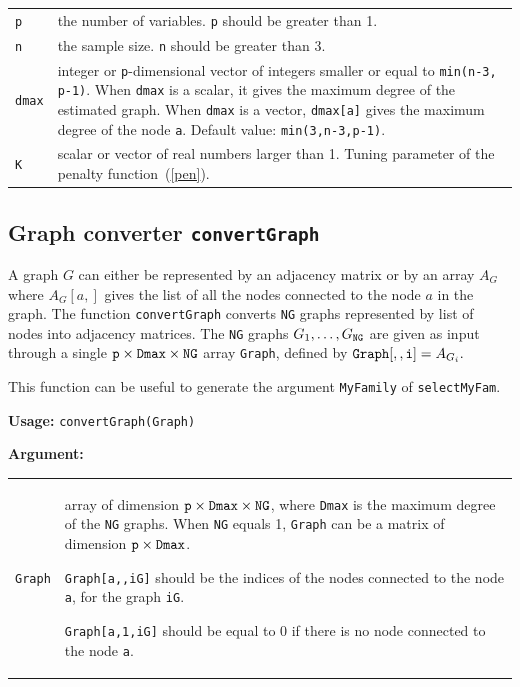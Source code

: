 \documentclass[noinfoline]{imsart}
\begin{document}
\begin{tabular}{lp{13cm}}
{\tt p}&	 the number of variables. {\tt p} should be greater than 1.\\
{\tt n}&	 the sample size. {\tt n} should be greater than 3.\\
{\tt dmax}&	 integer or {\tt p}-dimensional vector of integers smaller or equal to {\tt min(n-3, p-1)}. When {\tt dmax} is a scalar, it gives the maximum degree of the estimated graph. When {\tt dmax} is a vector, {\tt dmax[a]} gives the maximum degree of the node {\tt a}. Default value: {\tt min(3,n-3,p-1)}.\\
{\tt K}&	 scalar or vector of real numbers larger than 1. Tuning parameter of the penalty function~(\ref{pen}).
\end{tabular}




\subsection{Graph converter {\tt convertGraph}}
A graph $G$ can either be represented  by an adjacency matrix or by an array $A_{G}$ where $A_{G}[a,]$ gives the list of all the nodes connected to the node $a$ in the graph. The function {\tt convertGraph} converts
 {\tt NG} graphs represented by list of nodes into adjacency matrices. The {\tt NG} graphs $G_{1},\ldots,G_{{\tt NG}}$ are given as input through a single ${\tt p\times Dmax\times NG}$ array {\tt Graph}, defined by
${\tt Graph[,,i]}=A_{G_{i}} .$ 

This function can be useful to generate the argument {\tt MyFamily} of \mbox{{\tt selectMyFam}}.
\medskip

{\bf Usage:} {\tt convertGraph(Graph)}
\medskip

{\bf Argument:}


\begin{tabular}{lp{13cm}}
{\tt Graph} &	 array of dimension ${\tt p \times Dmax \times NG}$, where {\tt Dmax} is the maximum degree of the {\tt NG} graphs. When {\tt NG}  equals  1, {\tt Graph} can be a matrix of dimension ${\tt p \times Dmax}$.
 
{\tt Graph[a,,iG]} should be the indices of the nodes connected to the node {\tt a}, for the graph {\tt iG}.

{\tt Graph[a,1,iG]} should be equal to 0 if there is no node connected to the node {\tt a}.
\end{tabular}
\end{document}
